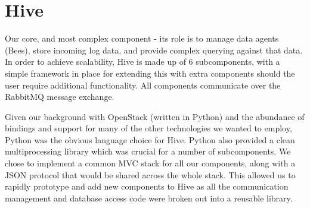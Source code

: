 \section{Hive}

Our core, and most complex component - its role is to manage data agents
(Bees), store incoming log data, and provide complex querying against that
data. In order to achieve scalability, Hive is made up of 6 subcomponents, with
a simple framework in place for extending this with extra components should the
user require additional functionality. All components communicate over the
RabbitMQ message exchange.

Given our background with OpenStack (written in Python) and the abundance of
bindings and support for many of the other technologies we wanted to employ,
Python was the obvious language choice for Hive. Python also provided a clean
multiprocessing library which was crucial for a number of subcomponents. We
chose to implement a common MVC stack for all our components, along with a JSON
protocol that would be shared across the whole stack. This allowed us to
rapidly prototype and add new components to Hive as all the communication
management and database access code were broken out into a reusable library.
